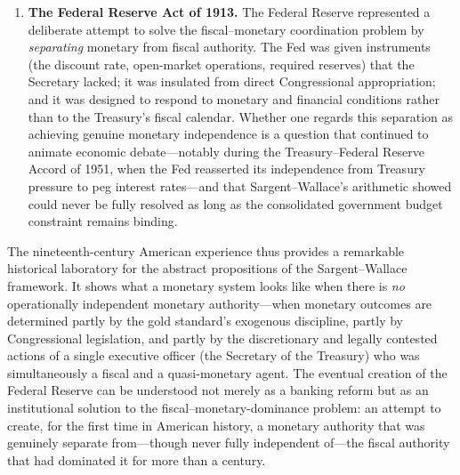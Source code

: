 \documentclass[12pt]{article}
\begin{document}
\begin{enumerate}
  \item \textbf{The Federal Reserve Act of 1913.}  The Federal Reserve
    represented a deliberate attempt to solve the fiscal--monetary
    coordination problem by \emph{separating} monetary from fiscal
    authority.  The Fed was given instruments (the discount rate,
    open-market operations, required reserves) that the Secretary
    lacked; it was insulated from direct Congressional appropriation;
    and it was designed to respond to monetary and financial
    conditions rather than to the Treasury's fiscal calendar.
    Whether one regards this separation as achieving genuine monetary
    independence is a question that continued to animate economic
    debate---notably during the Treasury--Federal Reserve Accord of
    1951, when the Fed reasserted its independence from Treasury
    pressure to peg interest rates---and that Sargent--Wallace's
    arithmetic showed could never be fully resolved as long as the
    consolidated government budget constraint remains binding.

\end{enumerate}

The nineteenth-century American experience thus provides a remarkable
historical laboratory for the abstract propositions of the
Sargent--Wallace framework.  It shows what a monetary system looks
like when there is \emph{no} operationally independent monetary
authority---when monetary outcomes are determined partly by the gold
standard's exogenous discipline, partly by Congressional legislation,
and partly by the discretionary and legally contested actions of a
single executive officer (the Secretary of the Treasury) who was
simultaneously a fiscal and a quasi-monetary agent.  The eventual
creation of the Federal Reserve can be understood not merely as a
banking reform but as an institutional solution to the
fiscal--monetary-dominance problem: an attempt to create, for the
first time in American history, a monetary authority that was
genuinely separate from---though never fully independent of---the
fiscal authority that had dominated it for more than a century.
\end{document}
